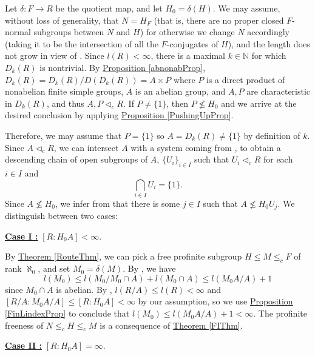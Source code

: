 \documentclass[12pt,a4paper]{article}
\newenvironment{proof}[1][Proof]{\begin{trivlist}
\item[\hskip \labelsep {\bfseries #1}]}{\end{trivlist}}
\newcommand{\thmref}[1]{\hyperref[#1]{Theorem \ref*{#1}}}
\newcommand{\propref}[1]{\hyperref[#1]{Proposition \ref*{#1}}}
\begin{document}
\begin{proof}

Let $\delta : F \rightarrow R$ be the quotient map, and let $H_0 = \delta(H)$. We may assume, without loss of generality, that $N = H_F$ (that is, there are no proper closed $F$-normal subgroups between $N$ and $H$) for otherwise we change $N$ accordingly (taking it to be the intersection of all the $F$-conjugates of $H$), and the length does not grow in view of \cite[Lemma 2.7 (1)]{BFW}. Since $l(R) < \infty$, there is a maximal $k \in \mathbb{N}$ for which $D_k(R)$ is nontrivial. By \propref{abnonabProp}, $D_k(R) = D_k(R)/D(D_k(R)) = A \times P$ where $P$ is a direct product of nonabelian finite simple groups, $A$ is an abelian group, and $A,P$ are characteristic in $D_k(R)$, and thus $A,P \lhd_c R$. If $P \neq \{1\}$, then $P \nleq H_0$ and we arrive at the desired conclusion by applying \propref{PushingUpProp}.

Therefore, we may assume that $P = \{1\}$ so $A = D_k(R) \neq \{1\}$ by definition of $k$. Since $A \lhd_c R$, we can intersect $A$ with a system coming from \cite[Theorem 2.1.3 (c)]{RZ}, to obtain a descending chain of open subgroups of $A$, $\{U_i\}_{i \in I}$ such that $U_i \lhd_c R$ for each $i \in I$ and $$\bigcap_{i \in I}U_i = \{1\}.$$ Since $A \nleq H_0$, we infer from \cite[Proposition 2.1.4 (a)]{RZ} that there is some $j \in I$ such that $A \nleq H_0U_j$. We distinguish between two cases:

\underline{\textbf{Case I :}} $[R :  H_0A] < \infty.$

By \thmref{RouteThm}, we can pick a free profinite subgroup \mbox{$H \leq M \leq_c F$} of rank $\aleph_0$, and set $M_0 = \delta(M)$. By \cite[Proposition 2.9]{BFW}, we have $$l(M_0) \leq l(M_0/M_0 \cap A) + l(M_0 \cap A) \leq l(M_0A/A) + 1$$ since $M_0 \cap A$ is abelian. By \cite[Lemma 2.7 (1)]{RZ}, $l(R/A) \leq l(R) < \infty$ and $[R/A : M_0A/A] \leq [R : H_0A] < \infty$ by our assumption, so we use \propref{FinLindexProp} to conclude that $l(M_0) \leq l(M_0A/A) + 1 < \infty$. The profinite freeness of $N \leq_c H \leq_c M$ is a consequence of \thmref{FIThm}.

\underline{\textbf{Case II :}} $[R :  H_0A] = \infty.$


\end{proof}
\end{document}
